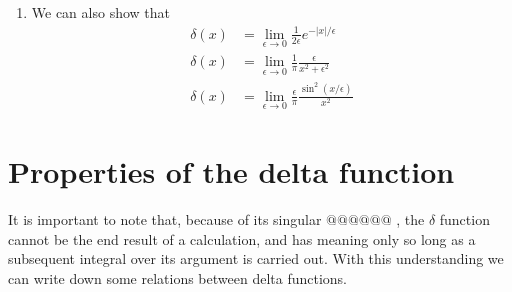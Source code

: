 \begin{enumerate}
		\item
		We can also show that
		\begin{eqnarray}
			\delta(x) &= \lim\limits_{\epsilon \rightarrow 0} \frac{1}{2\epsilon} e^{-|x| / \epsilon} \\
			\delta(x) &= \lim\limits_{\epsilon \rightarrow 0} \frac{1}{\pi} \frac{\epsilon}{x^2 + \epsilon^2} \\
			\delta(x) &= \lim\limits_{\epsilon \rightarrow 0} \frac{\epsilon}{\pi} \frac{\sin^2(x/\epsilon)}{x^2}
		\end{eqnarray}
		
		\end{enumerate}	
	\section{Properties of the delta function}
		It is important to note that, because of its singular $@@@@@@$ , the $\delta$ function cannot be the end result of a calculation, and has meaning only so long as a subsequent integral over its argument is carried out. With this understanding we can write down some relations between delta functions.
